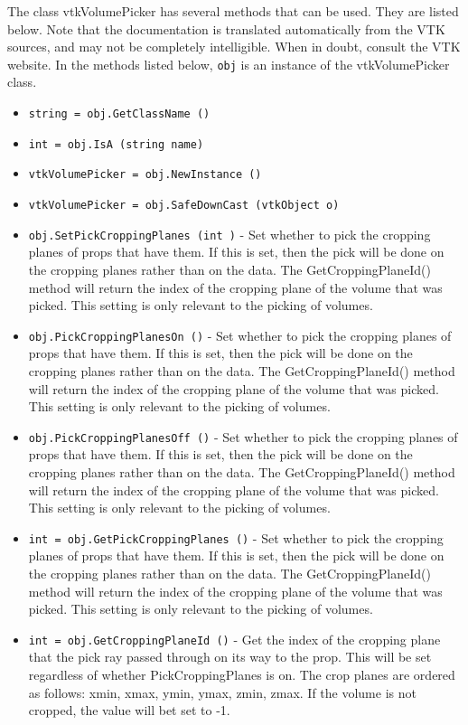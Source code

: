 The class vtkVolumePicker has several methods that can be used.
  They are listed below.
Note that the documentation is translated automatically from the VTK sources,
and may not be completely intelligible.  When in doubt, consult the VTK website.
In the methods listed below, \verb|obj| is an instance of the vtkVolumePicker class.
\begin{itemize}
\item  \verb|string = obj.GetClassName ()|

\item  \verb|int = obj.IsA (string name)|

\item  \verb|vtkVolumePicker = obj.NewInstance ()|

\item  \verb|vtkVolumePicker = obj.SafeDownCast (vtkObject o)|

\item  \verb|obj.SetPickCroppingPlanes (int )| -  Set whether to pick the cropping planes of props that have them.
 If this is set, then the pick will be done on the cropping planes
 rather than on the data. The GetCroppingPlaneId() method will return
 the index of the cropping plane of the volume that was picked.  This
 setting is only relevant to the picking of volumes.

\item  \verb|obj.PickCroppingPlanesOn ()| -  Set whether to pick the cropping planes of props that have them.
 If this is set, then the pick will be done on the cropping planes
 rather than on the data. The GetCroppingPlaneId() method will return
 the index of the cropping plane of the volume that was picked.  This
 setting is only relevant to the picking of volumes.

\item  \verb|obj.PickCroppingPlanesOff ()| -  Set whether to pick the cropping planes of props that have them.
 If this is set, then the pick will be done on the cropping planes
 rather than on the data. The GetCroppingPlaneId() method will return
 the index of the cropping plane of the volume that was picked.  This
 setting is only relevant to the picking of volumes.

\item  \verb|int = obj.GetPickCroppingPlanes ()| -  Set whether to pick the cropping planes of props that have them.
 If this is set, then the pick will be done on the cropping planes
 rather than on the data. The GetCroppingPlaneId() method will return
 the index of the cropping plane of the volume that was picked.  This
 setting is only relevant to the picking of volumes.

\item  \verb|int = obj.GetCroppingPlaneId ()| -  Get the index of the cropping plane that the pick ray passed
 through on its way to the prop. This will be set regardless
 of whether PickCroppingPlanes is on.  The crop planes are ordered
 as follows: xmin, xmax, ymin, ymax, zmin, zmax.  If the volume is
 not cropped, the value will bet set to -1.

\end{itemize}
